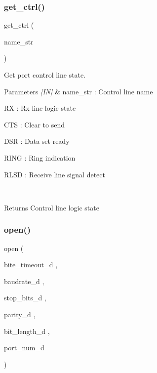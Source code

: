 \subsubsection{get\_ctrl()}
{\footnotesize\ttfamily get\+\_\+ctrl (\begin{DoxyParamCaption}\item[{name\+\_\+str}]{ }\end{DoxyParamCaption})}



Get port control line state. 


\begin{DoxyCode}{0}
\end{DoxyCode}



\begin{DoxyParams}{Parameters}
{\em \mbox{[}\+I\+N\mbox{]}} & name\+\_\+str \+: Control line name \begin{DoxyItemize}
\item RX \+: Rx line logic state \item C\+TS \+: Clear to send \item D\+SR \+: Data set ready \item R\+I\+NG \+: Ring indication \item R\+L\+SD \+: Receive line signal detect \end{DoxyItemize}
\\
\hline
\end{DoxyParams}
\begin{DoxyReturn}{Returns}
Control line logic state 
\end{DoxyReturn}
\mbox{\label{classuart_abe660e412aec60f8c6331dc1ecc5bd06}} 
\subsubsection{open()}
{\footnotesize\ttfamily open (\begin{DoxyParamCaption}\item[{bite\+\_\+timeout\+\_\+d}]{,  }\item[{baudrate\+\_\+d}]{,  }\item[{stop\+\_\+bits\+\_\+d}]{,  }\item[{parity\+\_\+d}]{,  }\item[{bit\+\_\+length\+\_\+d}]{,  }\item[{port\+\_\+num\+\_\+d}]{ }\end{DoxyParamCaption})}



